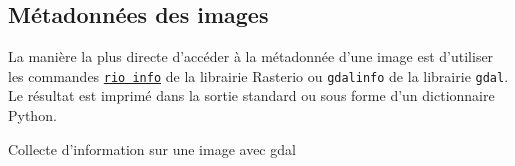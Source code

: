 \documentclass[
  11pt,
  letterpaper,
  open=any,
  twoside=false,
  french]{scrbook}
\newenvironment{Shaded}{\begin{snugshade}}{\end{snugshade}}
\newcommand{\NormalTok}[1]{\textcolor[rgb]{0.00,0.23,0.31}{#1}}
\newcommand{\OperatorTok}[1]{\textcolor[rgb]{0.37,0.37,0.37}{#1}}
\begin{document}
\subsection{Métadonnées des images}\label{muxe9tadonnuxe9es-des-images}

La manière la plus directe d'accéder à la métadonnée d'une image est
d'utiliser les commandes
\href{https://rasterio.readthedocs.io/en/stable/cli.html\#info}{\texttt{rio\ info}}
de la librairie Rasterio ou \texttt{gdalinfo} de la librairie
\texttt{gdal}. Le résultat est imprimé dans la sortie standard ou sous
forme d'un dictionnaire Python.

\begin{codelisting}

\caption{\label{lst-gdalinfo}Collecte d'information sur une image avec
gdal}

\centering{

\begin{Shaded}
\begin{Highlighting}[]
\OperatorTok{!}\NormalTok{gdalinfo RGBNIR\_of\_S2A.tif}
\end{Highlighting}
\end{Shaded}

}

\end{codelisting}%
\end{document}
